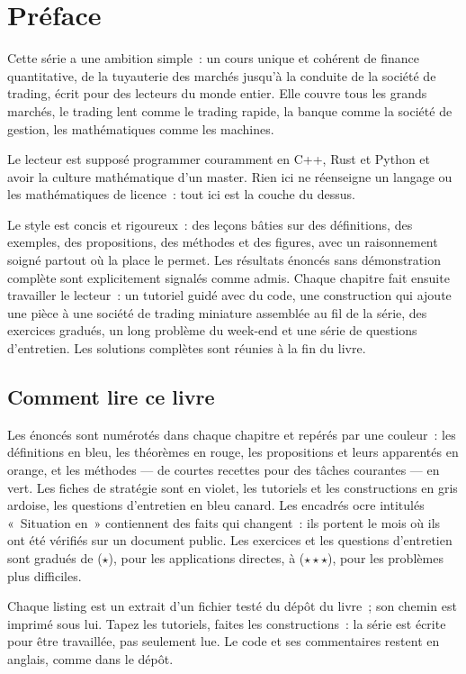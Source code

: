 \chapter{Préface}

Cette série a une ambition simple~: un cours unique et cohérent de finance
quantitative, de la tuyauterie des marchés jusqu'à la conduite de la société
de trading, écrit pour des lecteurs du monde entier. Elle couvre tous les
grands marchés, le trading lent comme le trading rapide, la banque comme la
société de gestion, les mathématiques comme les machines.

Le lecteur est supposé programmer couramment en C++, Rust et Python et avoir
la culture mathématique d'un master. Rien ici ne réenseigne un langage ou les
mathématiques de licence~: tout ici est la couche du dessus.

Le style est concis et rigoureux~: des leçons bâties sur des définitions, des
exemples, des propositions, des méthodes et des figures, avec un raisonnement
soigné partout où la place le permet. Les résultats énoncés sans
démonstration complète sont explicitement signalés comme admis. Chaque
chapitre fait ensuite travailler le lecteur~: un tutoriel guidé avec du code,
une construction qui ajoute une pièce à une société de trading miniature
assemblée au fil de la série, des exercices gradués, un long problème du
week-end et une série de questions d'entretien. Les solutions complètes sont
réunies à la fin du livre.

\section*{Comment lire ce livre}

Les énoncés sont numérotés dans chaque chapitre et repérés par une couleur~:
les définitions en bleu, les théorèmes en rouge, les propositions et leurs
apparentés en orange, et les méthodes --- de courtes recettes pour des tâches
courantes --- en vert. Les fiches de stratégie sont en violet, les tutoriels
et les constructions en gris ardoise, les questions d'entretien en bleu
canard. Les encadrés ocre intitulés «~Situation en~» contiennent des faits
qui changent~: ils portent le mois où ils ont été vérifiés sur un document
public. Les exercices et les questions d'entretien sont gradués de
($\star$), pour les applications directes, à ($\star\star\star$), pour les
problèmes plus difficiles.

Chaque listing est un extrait d'un fichier testé du dépôt du livre~; son
chemin est imprimé sous lui. Tapez les tutoriels, faites les
constructions~: la série est écrite pour être travaillée, pas seulement lue.
Le code et ses commentaires restent en anglais, comme dans le dépôt.

